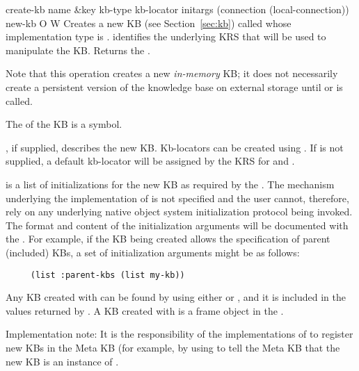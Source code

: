 \begin{okbcop}{create-kb}{ name \&key kb-type kb-locator initargs (connection (local-connection))} { new-kb } { O } { W } {  }
Creates a new KB (see Section~\ref{sec:kb}) called  whose
   implementation type is .   identifies the
   underlying KRS that will be used to manipulate the KB.  Returns the
   .

   Note that this operation creates a new {\em in-memory} KB; it does
   not necessarily create a persistent version of the knowledge base on
   external storage until  or  is called.

   The  of the KB is a symbol.

   , if supplied, describes the new KB.  Kb-locators can be
   created using .
   If  is not supplied, a default kb-locator will be assigned
   by the KRS for  and .

    is a list of initializations for the new KB as
   required by the .  The mechanism underlying the
   implementation of  is not specified and the user cannot,
   therefore, rely on any underlying native object system initialization
   protocol being invoked.  The format and content of the initialization
   arguments will be documented with the .  For example,
   if the KB being created allows the specification of parent (included) KBs,
   a set of initialization arguments might be as follows:
   \begin{verbatim}
     (list :parent-kbs (list my-kb))
   \end{verbatim}
   Any KB created with  can be found by using
   either  or , and it is included in
   the values returned by .  A KB created with
    is a frame object in the .

   Implementation note:  It is the responsibility of the implementations of
    to register new KBs in the Meta KB (for example, by using
    to tell the Meta KB that the new KB is an instance
   of .
\end{okbcop}

